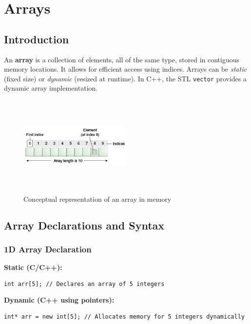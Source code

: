 \chapter{Arrays}

\section*{Introduction}
An \textbf{array} is a collection of elements, all of the same type, stored in contiguous memory locations. It allows for efficient access using indices. Arrays can be \textit{static} (fixed size) or \textit{dynamic} (resized at runtime). In C++, the STL \texttt{vector} provides a dynamic array implementation.

\begin{figure}[h!]
  \centering
  \includegraphics[width=0.5\textwidth, height=5cm]{images/array.png}
  \caption{Conceptual representation of an array in memory}
  \label{fig:array_concept}
\end{figure}

\section{Array Declarations and Syntax}

\subsection*{1D Array Declaration}
\textbf{Static (C/C++):}
\begin{lstlisting}[caption=Static 1D Array Declaration]
int arr[5]; // Declares an array of 5 integers
\end{lstlisting}

\textbf{Dynamic (C++ using pointers):}
\begin{lstlisting}[caption=Dynamic 1D Array Declaration using Pointers]
int* arr = new int[5]; // Allocates memory for 5 integers dynamically
\end{lstlisting}


